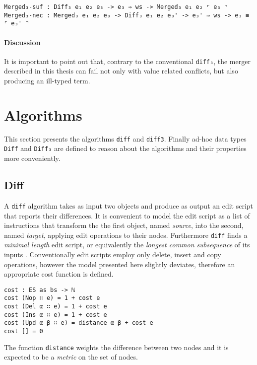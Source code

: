 \documentclass[../Thesis.tex]{subfiles}
\begin{document}
\begin{verbatim}
Merged₃-suf : Diff₃ e₁ e₂ e₃ -> e₃ ⇒ ws -> Merged₃ e₁ e₂ ⌜ e₃ ⌝
Merged₃-nec : Merged₃ e₁ e₂ e₃ -> Diff₃ e₁ e₂ e₃' -> e₃' ⇒ ws -> e₃ ≡ ⌜ e₃' ⌝
\end{verbatim}
	
	\paragraph{Discussion}
	It is important to point out that, contrary to the conventional
	\texttt{diff₃}, the merger described in this thesis can fail 
	not only with value related conflicts, but also producing
	an ill-typed term.
	
\section{Algorithms}
This section presents the algorithms \texttt{diff} and \texttt{diff3}.
Finally ad-hoc data types \texttt{Diff} and \texttt{Diff₃} are defined to
reason about the algorithms and their properties more conveniently.

	\subsection{Diff}
	\label{subsec:AlgoDiff}
	A \texttt{diff} algorithm takes as input two objects 
	and produce as output an edit script that reports their differences.
	It is convenient to model the edit script as a list of instructions that
	transform the the first object, named \emph{source}, into the second,
	named \emph{target}, applying edit operations to their nodes.
	Furthermore \texttt{diff} finds a \emph{minimal length} edit script, or
	equivalently the \emph{longest common subsequence} of its inputs
	\cite{Berg00, PierceDiff3}. 
	Conventionally edit scripts employ only delete, insert and copy operations,
	however the model presented here slightly deviates, therefore an 
	appropriate cost function is defined.
	
\begin{verbatim}
cost : ES as bs -> ℕ
cost (Nop ∷ e) = 1 + cost e
cost (Del α ∷ e) = 1 + cost e
cost (Ins α ∷ e) = 1 + cost e
cost (Upd α β ∷ e) = distance α β + cost e 
cost [] = 0
\end{verbatim}

	The function \texttt{distance} weights the difference between two nodes 
	and it is expected to be a \emph{metric} on the set of nodes.
\end{document}
